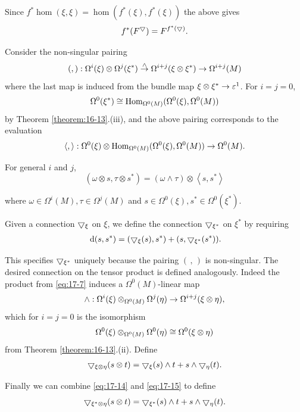 Since $f^*\hom(\xi, \xi)  = \hom( {f^*(\xi),f^*(\xi) })$ the above gives
\begin{align}\label{eq:17-13}
  f^*({F}^\bigtriangledown)  = {F}^{f^*( \bigtriangledown ) }.
\end{align}

Consider the non-singular pairing
\[
  (,):\Omega^{i}(\xi)  \otimes  \Omega^{j}( \xi^*) 
  \overset{ \land  }{ \rightarrow  }
  \Omega^{i + j}( {\xi  \otimes  \xi^*})  \rightarrow  \Omega^{i + j}(M)
\]
where the last map is induced from the bundle map $\xi  \otimes  \xi^* \rightarrow  {\varepsilon }^1$. 
For $i = j = 0$,
\[
  \Omega^0( \xi^*)  \cong  {\operatorname{Hom}}_{\Omega^0(M) }( {\Omega^0(\xi),\Omega^0(M) })
\]
by Theorem \ref{theorem:16-13}.(iii), and the above pairing corresponds to the evaluation
\[
  \langle,\rangle :\Omega^0(\xi)  \otimes  {\operatorname{Hom}}_{\Omega^0(M) }( {\Omega^0(\xi),\Omega^0(M) }) \rightarrow  \Omega^0(M).
\]

For general $i$ and $j$,
\[
  ( {\omega  \otimes  s,\tau  \otimes  s^*})  
  = ( {\omega  \land  \tau })  \otimes  \left\langle  {s,s^*}\right\rangle
\]

where $\omega  \in  \Omega^{i}(M),\tau  \in  \Omega^{j}(M)$ and $s \in  \Omega^0(\xi),s^* \in  \Omega^0(\xi^*)$.

Given a connection $\bigtriangledown_{\xi }$ on $\xi$, we define the 
connection $\bigtriangledown_{\xi^*}$ on $\xi^*$ by requiring
\begin{align}\label{eq:17-14}
\dd(s,s^*)  = ( {\btd_{\xi }(s),s^*})  + ( {s,\btd_{\xi^*}( s^*) }).
\end{align}

This specifies $\bigtriangledown_{\xi^*}$ uniquely because the pairing $(\,,\,)$ is non-singular. 
The desired connection on the tensor product is defined analogously. Indeed the product from \eqref{eq:17-7} induces 
a $\Omega^0(M)$-linear map
\[
  \land  :\Omega^{i}(\xi) \otimes_{\Omega^0(M) }\Omega^{j}( \eta )  \rightarrow  \Omega^{i + j}( {\xi  \otimes  \eta }),
\]
which for $i = j = 0$ is the isomorphism
\[
  \Omega^0(\xi) \otimes_{\Omega^0(M) }\Omega^0( \eta )  \cong  \Omega^0( {\xi  \otimes  \eta })
\]
from Theorem \ref{theorem:16-13}.(ii). Define
\begin{align}\label{eq:17-15}
  \bigtriangledown_{\xi  \otimes  \eta }( {s \otimes  t})  
  = \bigtriangledown_{\xi }(s)  \land  t + s \land  \bigtriangledown_{\eta }(t).
\end{align}

Finally we can combine \eqref{eq:17-14} and \eqref{eq:17-15} to define
\[
\bigtriangledown_{\xi^* \otimes  \eta }( {s \otimes  t})  = \bigtriangledown_{\xi^*}(s)  \land  t + s \land  \bigtriangledown_{\eta }(t).
\]

